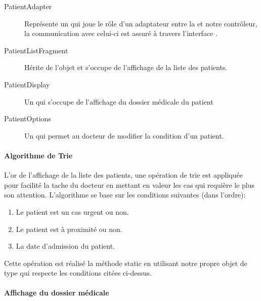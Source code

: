 \begin{description}

\item[PatientAdapter] Représente un  qui joue le rôle d'un adaptateur entre la  et notre contrôleur, la communication avec celui-ci est assuré à travers l'interface .

\item[PatientListFragment] Hérite de l'objet  et s'occupe de l'affichage de la liste des patients.

\item[PatientDisplay] Un  qui s'occupe de l'affichage du dossier médicale du patient

\item[PatientOptions] Un  qui permet au docteur de modifier la condition d'un patient.

\end{description}

\paragraph{Algorithme de Trie}

L'or de l'affichage de la liste des patients, une opération de trie est appliquée pour facilité la tache du docteur en mettant en valeur les cas qui requière le plus son attention.
L’algorithme se base sur les conditions suivantes (dans l'ordre):

\begin{enumerate}

\item Le patient est un cas urgent ou non.

\item Le patient est à proximité ou non.

\item La date d'admission du patient.

\end{enumerate}

Cette opération est réalisé la méthode static  en utilisant notre propre objet de type  qui respecte les conditions citées ci-dessus.


\paragraph{Affichage du dossier médicale}

